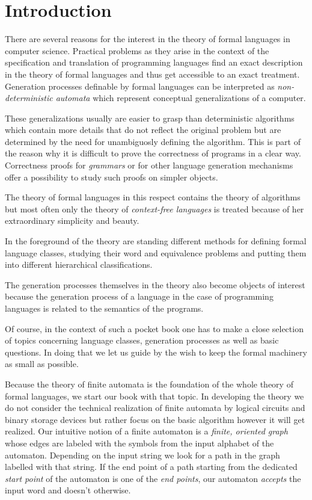 \chapter*{Introduction}

There are several reasons for the interest in the theory of formal languages in
computer science. Practical problems as they arise in the context of the
specification and translation of programming languages find an exact description
in the theory of formal languages and thus get accessible to an exact treatment.
Generation processes definable by formal languages can be interpreted as {\em
non-deterministic automata} which represent conceptual generalizations of a
computer.

These generalizations usually are easier to grasp than deterministic algorithms
which contain more details that do not reflect the original problem but are
determined by the need for unambiguosly defining the algorithm. This is part of
the reason why it is difficult to prove the correctness of programs in a clear
way. Correctness proofs for {\em grammars} or for other language generation
mechanisms offer a possibility to study such proofs on simpler objects.

The theory of formal languages in this respect contains the theory of algorithms
but most often only the theory of {\em context-free languages} is treated
because of her extraordinary simplicity and beauty.

In the foreground of the theory are standing different methods for defining
formal language classes, studying their word and equivalence problems and
putting them into different hierarchical classifications.

The generation processes themselves in the theory also become objects of
interest because the generation process of a language in the case of programming
languages is related to the semantics of the programs.

Of course, in the context of such a pocket book one has to make a close
selection of topics concerning language classes, generation processes as well as
basic questions. In doing that we let us guide by the wish to keep the formal
machinery as small as possible.

Because the theory of finite automata is the foundation of the whole theory of
formal languages, we start our book with that topic. In developing the theory we
do not consider the technical realization of finite automata by logical circuits
and binary storage devices but rather focus on the basic algorithm however it
will get realized. Our intuitive notion of a finite automaton is a {\em finite,
oriented graph} whose edges are labeled with the symbols from the input alphabet
of the automaton. Depending on the input string we look for a path in the graph
labelled with that string. If the end point of a path starting from the
dedicated {\em start point} of the automaton is one of the {\em end points}, our
automaton {\em accepts} the input word and doesn't otherwise.

